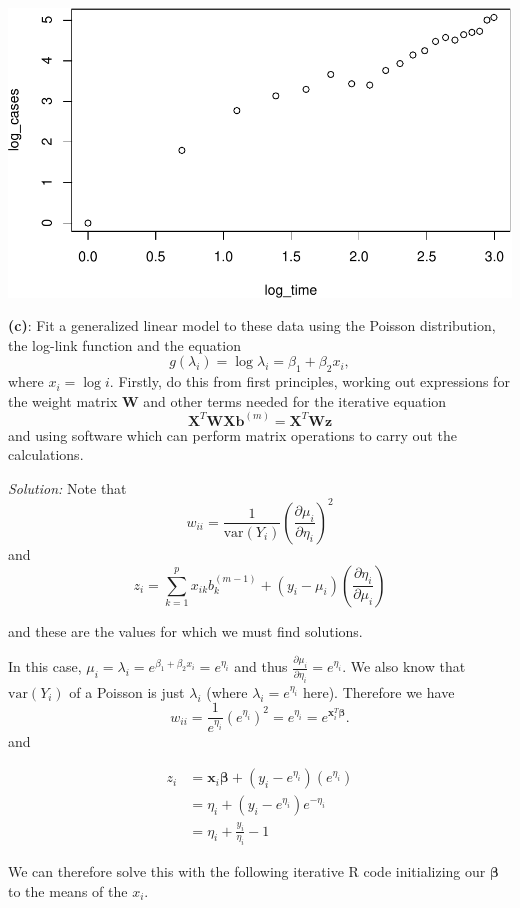 \documentclass[]{article}
\begin{document}
\includegraphics{ExercisesWithSolutions_files/figure-latex/unnamed-chunk-2-1.pdf}

\textbf{(c)}: Fit a generalized linear model to these data using the
Poisson distribution, the log-link function and the equation \[
g(\lambda_i) = \log\lambda_i = \beta_1 + \beta_2x_i,
\] where \(x_i = \log i\). Firstly, do this from first principles,
working out expressions for the weight matrix \(\bm{W}\) and other terms
needed for the iterative equation \[
\bm{X}^T\bm{WXb}^{(m)} = \bm{X}^T\bm{Wz}
\] and using software which can perform matrix operations to carry out
the calculations.

\emph{Solution: } Note that \[
w_{ii} = \frac{1}{\text{var}(Y_i)}\left(\frac{\partial \mu_i}{\partial \eta_i}\right)^2
\] and \[
z_i = \sum_{k=1}^px_{ik}b_k^{(m-1)} + (y_i - \mu_i)\left(\frac{\partial \eta_i}{\partial \mu_i}\right)
\]

and these are the values for which we must find solutions.

In this case,
\(\mu_i = \lambda_i = e^{\beta_1 + \beta_2x_i} = e^{\eta_i}\) and thus
\(\frac{\partial \mu_i}{\partial \eta_i} = e^{\eta_i}\). We also know
that \(\text{var}(Y_i)\) of a Poisson is just \(\lambda_i\) (where
\(\lambda_i = e^{\eta_i}\) here). Therefore we have \[
w_{ii} = \frac{1}{e^{\eta_i}}\left(e^{\eta_i}\right)^2 = e^{\eta_i} = e^{\bm{x}_i^T\bm{\beta}}.
\] and

\begin{align*}
z_i &= \bm{x}_i\bm{\beta} + (y_i - e^{\eta_i})(e^{\eta_i})\\
    &= \eta_i + (y_i - e^{\eta_i})e^{-\eta_i}\\
    &= \eta_i + \frac{y_i}{\eta_i} - 1
\end{align*}

We can therefore solve this with the following iterative R code
initializing our \(\bm{\beta}\) to the means of the \(x_i\).
\end{document}
